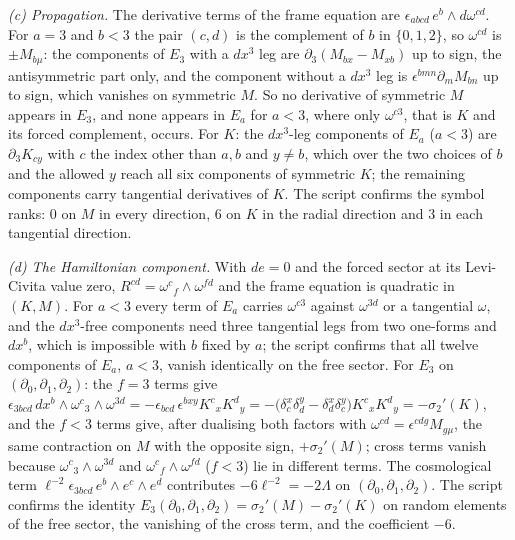 \emph{(c) Propagation.} The derivative terms of the frame equation are $\epsilon_{abcd}\,e^b\wedge d\omega^{cd}$. For $a = 3$ and $b < 3$ the pair $(c,d)$ is the complement of $b$ in $\{0,1,2\}$, so $\omega^{cd}$ is $\pm M_{b\mu}$: the components of $E_3$ with a $dx^3$ leg are $\partial_3(M_{bx} - M_{xb})$ up to sign, the antisymmetric part only, and the component without a $dx^3$ leg is $\epsilon^{bmn}\partial_m M_{bn}$ up to sign, which vanishes on symmetric $M$. So no derivative of symmetric $M$ appears in $E_3$, and none appears in $E_a$ for $a < 3$, where only $\omega^{c3}$, that is $K$ and its forced complement, occurs. For $K$: the $dx^3$-leg components of $E_a$ ($a < 3$) are $\partial_3 K_{c y}$ with $c$ the index other than $a, b$ and $y \neq b$, which over the two choices of $b$ and the allowed $y$ reach all six components of symmetric $K$; the remaining components carry tangential derivatives of $K$. The script confirms the symbol ranks: $0$ on $M$ in every direction, $6$ on $K$ in the radial direction and $3$ in each tangential direction.

\emph{(d) The Hamiltonian component.} With $de = 0$ and the forced sector at its Levi-Civita value zero, $R^{cd} = \omega^{c}{}_{f}\wedge\omega^{fd}$ and the frame equation is quadratic in $(K, M)$. For $a < 3$ every term of $E_a$ carries $\omega^{c3}$ against $\omega^{3d}$ or a tangential $\omega$, and the $dx^3$-free components need three tangential legs from two one-forms and $dx^b$, which is impossible with $b$ fixed by $a$; the script confirms that all twelve components of $E_a$, $a<3$, vanish identically on the free sector. For $E_3$ on $(\partial_0,\partial_1,\partial_2)$: the $f = 3$ terms give $\epsilon_{3bcd}\,dx^b\wedge\omega^{c}{}_{3}\wedge\omega^{3d} = -\epsilon_{bcd}\,\epsilon^{bxy}K^{c}{}_{x}K^{d}{}_{y} = -\bigl(\delta^x_c\delta^y_d - \delta^x_d\delta^y_c\bigr)K^{c}{}_{x}K^{d}{}_{y} = -\sigma_2'(K)$, and the $f < 3$ terms give, after dualising both factors with $\omega^{cd} = \epsilon^{cdg}M_{g\mu}$, the same contraction on $M$ with the opposite sign, $+\sigma_2'(M)$; cross terms vanish because $\omega^{c}{}_{3}\wedge\omega^{3d}$ and $\omega^{c}{}_{f}\wedge\omega^{fd}$ ($f<3$) lie in different terms. The cosmological term $\ell^{-2}\epsilon_{3bcd}\,e^b\wedge e^c\wedge e^d$ contributes $-6\ell^{-2} = -2\Lambda$ on $(\partial_0,\partial_1,\partial_2)$. The script confirms the identity $E_3(\partial_0,\partial_1,\partial_2) = \sigma_2'(M) - \sigma_2'(K)$ on random elements of the free sector, the vanishing of the cross term, and the coefficient $-6$.
